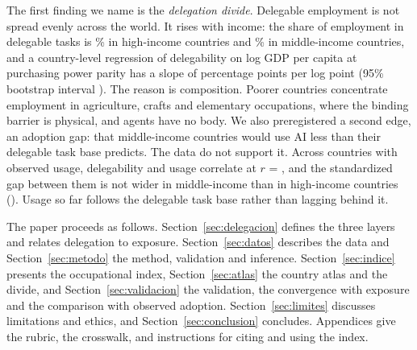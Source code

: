 The first finding we name is the \emph{delegation divide}.
Delegable employment is not spread evenly across the world.
It rises with income: the share of employment in delegable tasks is \% in high-income countries and \% in middle-income countries, and a country-level regression of delegability on log GDP per capita at purchasing power parity has a slope of  percentage points per log point (95\% bootstrap interval ).
The reason is composition.
Poorer countries concentrate employment in agriculture, crafts and elementary occupations, where the binding barrier is physical, and agents have no body.
We also preregistered a second edge, an adoption gap: that middle-income countries would use AI less than their delegable task base predicts.
The data do not support it.
Across  countries with observed usage, delegability and usage correlate at $r$ = , and the standardized gap between them is not wider in middle-income than in high-income countries ().
Usage so far follows the delegable task base rather than lagging behind it.

The paper proceeds as follows.
Section~\ref{sec:delegacion} defines the three layers and relates delegation to exposure.
Section~\ref{sec:datos} describes the data and Section~\ref{sec:metodo} the method, validation and inference.
Section~\ref{sec:indice} presents the occupational index, Section~\ref{sec:atlas} the country atlas and the divide, and Section~\ref{sec:validacion} the validation, the convergence with exposure and the comparison with observed adoption.
Section~\ref{sec:limites} discusses limitations and ethics, and Section~\ref{sec:conclusion} concludes.
Appendices give the rubric, the crosswalk, and instructions for citing and using the index.
